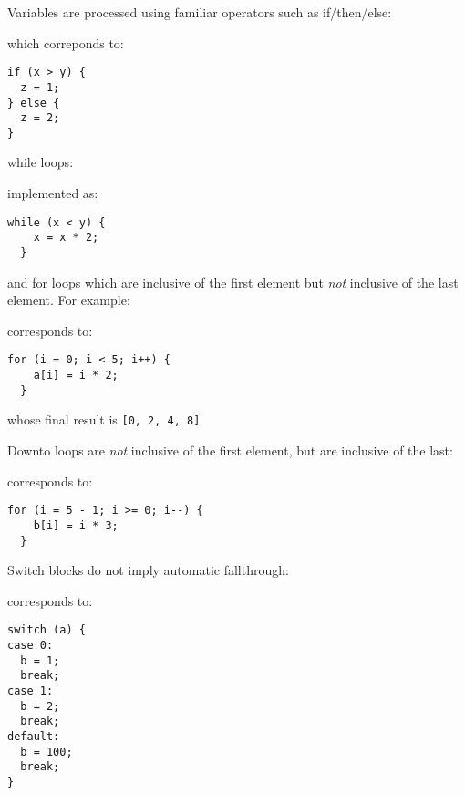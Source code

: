 \clearpage

\noindent
Variables are processed using familiar operators such as if/then/else:
\par
\noindent
\begin{algorithm}[H]
  \DontPrintSemicolon
\end{algorithm}
\par
\noindent
which correponds to:
\begin{Verbatim}[xleftmargin=.25in]
if (x > y) {
  z = 1;
} else {
  z = 2;
}
\end{Verbatim}
while loops:
\par
\noindent
\begin{algorithm}[H]
  \DontPrintSemicolon
\end{algorithm}
\par
\noindent
implemented as:
\begin{Verbatim}[xleftmargin=.25in]
  while (x < y) {
    x = x * 2;
  }
\end{Verbatim}
and for loops which are inclusive of the first element
but \textit{not} inclusive of the last element.
For example:
\par
\noindent
\begin{algorithm}[H]
  \DontPrintSemicolon
\end{algorithm}
\par
\noindent
corresponds to:
\begin{Verbatim}[xleftmargin=.25in]
  for (i = 0; i < 5; i++) {
    a[i] = i * 2;
  }
\end{Verbatim}
whose final result is \texttt{[0, 2, 4, 8]}
\par
\noindent
Downto loops are \textit{not} inclusive of the first element,
but are inclusive of the last:
\par
\noindent
\begin{algorithm}[H]
  \DontPrintSemicolon
\end{algorithm}
corresponds to:
\begin{Verbatim}[xleftmargin=.25in]
  for (i = 5 - 1; i >= 0; i--) {
    b[i] = i * 3;
  }
\end{Verbatim}

\clearpage

Switch blocks do not imply automatic fallthrough:
\par
\noindent
\begin{algorithm}[H]
  \DontPrintSemicolon
\end{algorithm}
\par
\noindent
corresponds to:
\begin{Verbatim}[xleftmargin=.25in]
switch (a) {
case 0:
  b = 1;
  break;
case 1:
  b = 2;
  break;
default:
  b = 100;
  break;
}
\end{Verbatim}

